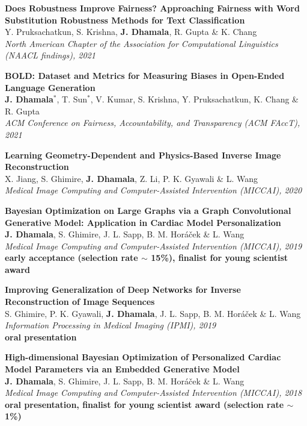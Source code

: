 \documentclass[margin]{res}
\begin{document}
\begin{resume}
\textbf{Does Robustness Improve Fairness? Approaching Fairness with Word Substitution Robustness Methods for Text Classification}\\
\small{Y. Pruksachatkun, S. Krishna, \textbf{J. Dhamala}, R. Gupta \& K. Chang}  \\
{\sl North American Chapter of the Association for Computational Linguistics (NAACL findings), 2021}

\textbf{BOLD: Dataset and Metrics for Measuring Biases in Open-Ended Language Generation}\\
\small{\textbf{J. Dhamala$^*$}, T. Sun$^*$, V. Kumar, S. Krishna, Y. Pruksachatkun, K. Chang \& R. Gupta}\\
{\sl ACM Conference on Fairness, Accountability, and Transparency (ACM FAccT), 2021}

\textbf{Learning Geometry-Dependent and Physics-Based Inverse Image Reconstruction}\\
\small{X. Jiang, S. Ghimire, \textbf{J. Dhamala}, Z. Li, P. K. Gyawali \& L. Wang}\\
{\sl Medical Image Computing and Computer-Assisted Intervention (MICCAI), 2020}

\textbf{Bayesian Optimization on Large Graphs via a Graph Convolutional Generative Model: Application in Cardiac Model Personalization}\\
\small{\textbf{J. Dhamala}, S. Ghimire, J. L. Sapp, B. M. Hor\'{a}\v{c}ek \& L. Wang}\\
{\sl Medical Image Computing and Computer-Assisted Intervention (MICCAI), 2019}\\
\textbf{early acceptance (selection rate $\sim$ 15\%), finalist for young scientist award}

\textbf{Improving Generalization of Deep Networks for Inverse Reconstruction of Image Sequences}\\
\small{S. Ghimire, P. K. Gyawali, \textbf{J. Dhamala}, J. L. Sapp, B. M. Hor\'{a}\v{c}ek \& L. Wang}\\
{\sl Information Processing in Medical Imaging (IPMI), 2019}\\
\textbf{oral presentation}

\textbf{High-dimensional Bayesian Optimization of Personalized Cardiac Model Parameters via an Embedded Generative Model}\\
\small{\textbf{J. Dhamala}, S. Ghimire, J. L. Sapp, B. M. Hor\'{a}\v{c}ek \& L. Wang}\\
{\sl Medical Image Computing and Computer-Assisted Intervention (MICCAI), 2018}\\
\textbf{oral presentation, finalist for young scientist award (selection rate $\sim$ 1\%)}


\end{resume}
\end{document}
